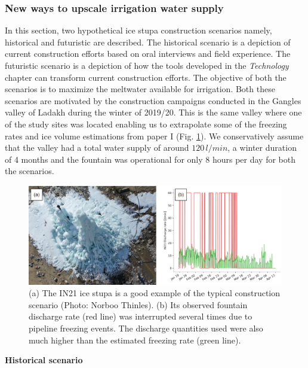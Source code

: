 \subsubsection{New ways to upscale irrigation water supply}

In this section, two hypothetical ice stupa construction scenarios namely, historical and futuristic are
described. The historical scenario is a depiction of current construction efforts based on oral interviews and
field experience. The futuristic scenario is a depiction of how the tools developed in the \textit{Technology}
chapter can transform current construction efforts. The objective of both the scenarios is to maximize the
meltwater available for irrigation. Both these scenarios are motivated by the construction campaigns conducted
in the Gangles valley of Ladakh during the winter of 2019/20. This is the same valley where one of the study
sites was located enabling us to extrapolate some of the freezing rates and ice volume estimations from paper I
(Fig. \ref{fig:gangles_data}). We conservatively assume that the valley had a total water supply of around
$120\,l/min$, a winter duration of 4 months and the fountain was operational for only 8 hours per day for both
the scenarios. 

\begin{figure}[htb]
	\includegraphics[width=\textwidth]{figs/gangles_data}

  \caption{(a) The IN21 ice stupa is a good example of the typical construction scenario (Photo: Norboo
  Thinles). (b) Its observed fountain discharge rate (red line) was interrupted several times due to pipeline
freezing events. The discharge quantities used were also much higher than the estimated freezing rate (green
line). }

	\label{fig:gangles_data}
\end{figure}

\textbf{Historical scenario}

